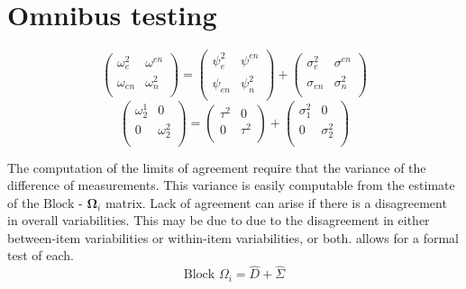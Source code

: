 \documentclass[12pt, a4paper]{report}
\theoremstyle{plain}
\theoremstyle{definition}
\theoremstyle{remark}
\begin{document}
	\section{Omnibus testing}
	
	
	\begin{equation}
	\left( \begin{array}{cc}
	\omega^2_{e} & \omega^{en} \\
	\omega_{en} & \omega^2_{n} \\
	\end{array}\right)
	=
	\left( \begin{array}{cc}
	\psi^2_{e} & \psi^{en} \\
	\psi_{en} & \psi^2_{n} \\
	\end{array}\right)
	+
	\left( \begin{array}{cc}
	\sigma^2_{e} & \sigma^{en} \\
	\sigma_{en} & \sigma^2_{n} \\
	\end{array}\right)
	\end{equation}
	\[\left(\begin{array}{cc}
	\omega^1_2  & 0 \\
	0 & \omega^2_2 \\
	\end{array}  \right)
	=  \left(
	\begin{array}{cc}
	\tau^2  & 0 \\
	0 & \tau^2 \\
	\end{array} \right)+
	\left(
	\begin{array}{cc}
	\sigma^2_1  & 0 \\
	0 & \sigma^2_2 \\
	\end{array}\right)
	\]
	
	The computation of the limits of agreement require that the variance of the difference of measurements. This variance is easily computable from the estimate of the ${\mbox{Block - }\boldsymbol \Omega_{i}}$ matrix. Lack of agreement can arise if there is a disagreement in overall variabilities. This may be due to due to the disagreement in either between-item
	variabilities or within-item variabilities, or both. \citet{ARoy2009} allows for a formal test of each.
	\begin{equation}
	\mbox{Block  }\Omega_{i} = \hat{D} + \hat{\Sigma}
	\end{equation}
	
\end{document}
